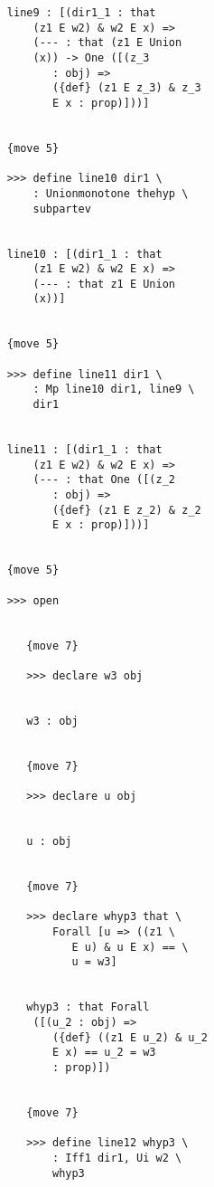 \documentclass[12pt]{article}
\begin{document}
\begin{verbatim}
                  line9 : [(dir1_1 : that 
                      (z1 E w2) & w2 E x) => 
                      (--- : that (z1 E Union 
                      (x)) -> One ([(z_3 
                         : obj) => 
                         ({def} (z1 E z_3) & z_3 
                         E x : prop)]))]


                  {move 5}

                  >>> define line10 dir1 \
                      : Unionmonotone thehyp \
                      subpartev


                  line10 : [(dir1_1 : that 
                      (z1 E w2) & w2 E x) => 
                      (--- : that z1 E Union 
                      (x))]


                  {move 5}

                  >>> define line11 dir1 \
                      : Mp line10 dir1, line9 \
                      dir1


                  line11 : [(dir1_1 : that 
                      (z1 E w2) & w2 E x) => 
                      (--- : that One ([(z_2 
                         : obj) => 
                         ({def} (z1 E z_2) & z_2 
                         E x : prop)]))]


                  {move 5}

                  >>> open


                     {move 7}

                     >>> declare w3 obj


                     w3 : obj


                     {move 7}

                     >>> declare u obj


                     u : obj


                     {move 7}

                     >>> declare whyp3 that \
                         Forall [u => ((z1 \
                            E u) & u E x) == \
                            u = w3]


                     whyp3 : that Forall 
                      ([(u_2 : obj) => 
                         ({def} ((z1 E u_2) & u_2 
                         E x) == u_2 = w3 
                         : prop)])


                     {move 7}

                     >>> define line12 whyp3 \
                         : Iff1 dir1, Ui w2 \
                         whyp3



\end{verbatim}
\end{document}
